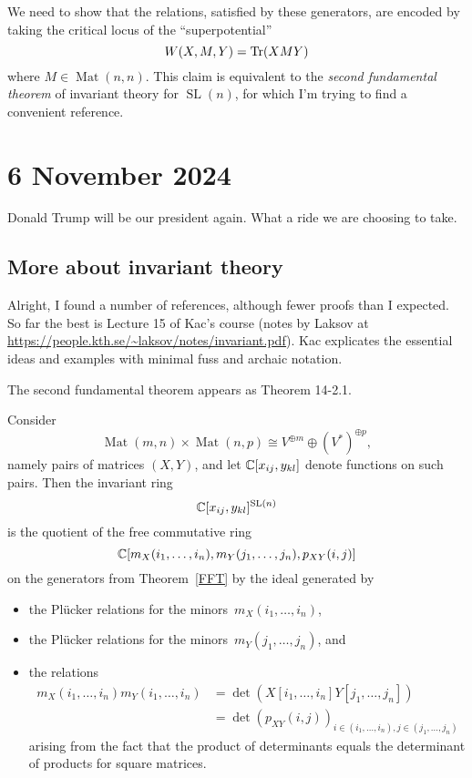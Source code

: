 \documentclass[11pt]{amsart}
\DeclareMathOperator{\SL}{SL}
\DeclareMathOperator{\Mat}{Mat}
\begin{document}
We need to show that the relations, satisfied by these generators, are encoded by taking the critical locus of the ``superpotential''
\[
W(X,M,Y) = \operatorname{Tr}(XMY)
\]
where $M \in \Mat(n,n)$.
This claim is equivalent to the {\em second fundamental theorem} of invariant theory for $\SL(n)$,
for which I'm trying to find a convenient reference.

\section{6 November 2024}

Donald Trump will be our president again.
What a ride we are choosing to take.

\subsection{More about invariant theory}

Alright, I found a number of references, although fewer proofs than I expected.
So far the best is Lecture 15 of Kac's course (notes by Laksov at \url{https://people.kth.se/~laksov/notes/invariant.pdf}).
Kac explicates the essential ideas and examples with minimal fuss and archaic notation.

The second fundamental theorem appears as Theorem 14-2.1.

\begin{thm}[SFT for $\SL(n)$]
Consider 
\[
\Mat(m,n) \times \Mat(n,p)\cong V^{\oplus m} \oplus (V^*)^{\oplus p},
\]
namely pairs of matrices $(X,Y)$, and let $\mathbb C[x_{ij}, y_{kl}]$ denote functions on such pairs.
Then the invariant ring
\[
\CC[x_{ij}, y_{kl}]^{\SL(n)}
\]
is the quotient of the free commutative ring 
\[
\mathbb C[m_X(i_1,\ldots, i_n), m_Y(j_1,\ldots, j_n), p_{XY}(i,j)]
\]
on the generators from Theorem~\ref{FFT}
by the ideal generated by
\begin{itemize}
\item the Pl\"ucker relations for the minors~$m_X(i_1,\ldots, i_n)$,
\item the Pl\"ucker relations for the minors~$m_Y(j_1,\ldots, j_n)$, and
\item the relations
\begin{align*}
m_X(i_1,\ldots, i_n)m_Y(i_1,\ldots, i_n) 
&= \det(X[i_1,\ldots,i_n]Y[j_1,\ldots,j_n]) \\
&= \det(p_{XY}(i,j))_{i \in (i_1,\ldots, i_n), j \in (j_1,\ldots, j_n)}
\end{align*}
arising from the fact that the product of determinants equals the determinant of products for square matrices.
\end{itemize}
\end{thm}
\end{document}
